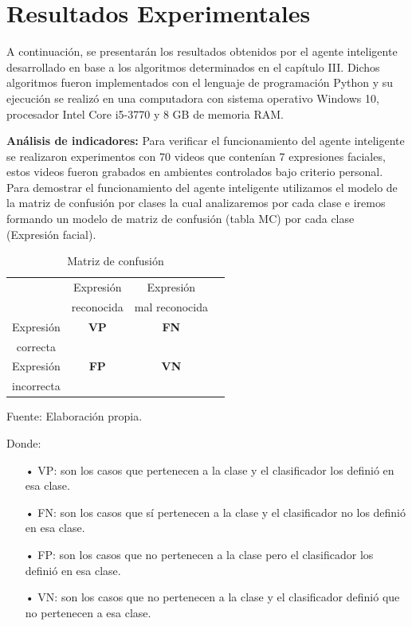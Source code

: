 \vskip 7cm

\section{Resultados Experimentales}

A continuación, se presentarán los resultados obtenidos por el agente inteligente desarrollado en base a los algoritmos determinados en el capítulo III. Dichos algoritmos fueron implementados con el lenguaje de programación Python y su ejecución se realizó en una computadora con sistema operativo Windows 10, procesador Intel Core i5-3770 y 8 GB de memoria RAM. \vskip 0.1cm

{\bf Análisis de indicadores:} \vskip 0.1cm
Para verificar el funcionamiento del agente inteligente se realizaron experimentos con 70 videos que contenían 7 expresiones faciales, estos videos fueron grabados en ambientes controlados bajo criterio personal.
\vskip 0.1cm
Para demostrar el funcionamiento del agente inteligente utilizamos el modelo de la matriz de confusión por clases la cual analizaremos por cada clase e iremos formando un modelo de matriz de confusión (tabla MC) por cada clase (Expresión facial).

\begin{table}[ht!]
\centering
\caption{Matriz de confusión} \vskip 0.1cm
\begin{tabular}{|c|c|c|c|} \hline
 & Expresión \par & Expresión \par \\
& reconocida & mal reconocida\\ \hline
Expresión \par & \bf VP & \bf FN \\ 
correcta & & \\ \hline 
Expresión \par & \bf FP & \bf VN \\ 
incorrecta & & \\ \hline 
\end{tabular}
\begin{center}
{\small{Fuente: Elaboración propia.}}
\end{center}
\end{table}

Donde: \vskip 0.1cm

\begin{itemize}
\item[•] VP: son los casos que pertenecen a la clase y el clasificador los definió en esa clase. 
\item[•] FN: son los casos que sí pertenecen a la clase y el clasificador no los definió en esa clase. 
\item[•] FP: son los casos que no pertenecen a la clase pero el clasificador los definió en esa clase. 
\item[•] VN: son los casos que no pertenecen a la clase y el clasificador definió que no pertenecen a esa clase.
\end{itemize}

